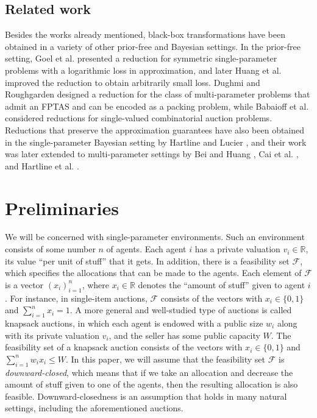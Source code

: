 \documentclass[runningheads,a4paper]{llncs}
\begin{document}
\subsection{Related work}

Besides the works already mentioned, black-box transformations have been obtained in a variety of other prior-free and Bayesian settings. In the prior-free setting, Goel et al. \cite{GoelKaWa10} presented a reduction for symmetric single-parameter problems with a logarithmic loss in approximation, and later Huang et al. \cite{HuangWaZh11} improved the reduction to obtain arbitrarily small loss. Dughmi and Roughgarden \cite{DughmiRo14} designed a reduction for the class of multi-parameter problems that admit an FPTAS and can be encoded as a packing problem, while Babaioff et al. \cite{BabaioffLaPa09} considered reductions for single-valued combinatorial auction problems.  
Reductions that preserve the approximation guarantees have also been obtained in the single-parameter Bayesian setting by Hartline and Lucier \cite{HartlineLu10}, and their work was later extended to multi-parameter settings by Bei and Huang \cite{BeiHu11}, Cai et al. \cite{CaiDaWe13}, and Hartline et al. \cite{HartlineKlMa15}. 

\section{Preliminaries}

We will be concerned with single-parameter environments. Such an environment consists of some number $n$ of agents. Each agent $i$ has a private valuation $v_i\in\mathbb{R}$, its value ``per unit of stuff'' that it gets. In addition, there is a feasibility set $\mathcal{F}$, which specifies the allocations that can be made to the agents. Each element of $\mathcal{F}$ is a vector $(x_i)_{i=1}^n$, where $x_i\in\mathbb{R}$ denotes the ``amount of stuff'' given to agent $i$. For instance, in single-item auctions, $\mathcal{F}$ consists of the vectors with $x_i\in\{0,1\}$ and $\sum_{i=1}^nx_i=1$. A more general and well-studied type of auctions is called knapsack auctions, in which each agent is endowed with a public size $w_i$ along with its private valuation $v_i$, and the seller has some public capacity $W$. The feasibility set of a knapsack auction consists of the vectors with $x_i\in\{0,1\}$ and $\sum_{i=1}^nw_ix_i\leq W$. In this paper, we will assume that the feasibility set $\mathcal{F}$ is \emph{downward-closed}, which means that if we take an allocation and decrease the amount of stuff given to one of the agents, then the resulting allocation is also feasible. Downward-closedness is an assumption that holds in many natural settings, including the aforementioned auctions.
\end{document}
